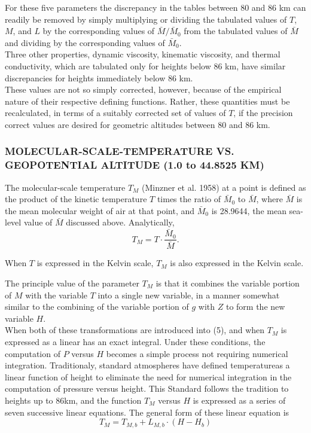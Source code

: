 \documentclass{article}
\begin{document}
For these five parameters the discrepancy in the tables between 80 and 86 km can readily be removed by simply multiplying or dividing the tabulated values of $T$, $M$, and $L$ by the corresponding values of $\bar{M} / \bar{M}_0$ from the tabulated values of $\bar{M}$ and dividing by the corresponding values of $\bar{M}_0$.\\

Three other properties, dynamic viscosity, kinematic viscosity, and thermal conductivity, which are tabulated only for heights below 86 km, have similar discrepancies for heights immediately below 86 km.\\

These values are not so simply corrected, however, because of the empirical nature of their respective defining functions. Rather, these quantities must be recalculated, in terms of a suitably corrected set of values of $T$, if the precision correct values are desired for geometric altitudes between 80 and 86 km.\\

\subsubsection{MOLECULAR-SCALE-TEMPERATURE VS. GEOPOTENTIAL ALTITUDE (1.0 to 44.8525 KM)}

The molecular-scale temperature $T_M$ (Minzner et al. 1958) at a point is defined as the product of the kinetic temperature $T$ times the ratio of $\bar{M}_0$ to $\bar{M}$, where $\bar{M}$ is the mean molecular weight of air at that point, and $\bar{M}_0$ is 28.9644, the mean sea-level value of $\bar{M}$ discussed above. Analytically,
\begin{equation}
  T_M = T \cdot \frac{\bar{M}_0}{\bar{M}}. \tag{22}
\end{equation}

When $T$ is expressed in the Kelvin scale, $T_M$ is also expressed in the Kelvin scale.

The principle value of the parameter $T_M$ is that it combines the variable portion of $M$ with the variable $T$ into a single new variable, in a manner somewhat similar to the combining of the variable portion of $g$ with $Z$ to form the new variable $H$.\\
When both of these transformations are introduced into (5), and when $T_M$ is expressed as a linear has an exact integral. Under these conditions, the computation of $P$ versus $H$ becomes a simple process not requiring numerical integration. Traditionaly, standard atmospheres have defined temperatureas a linear function of height to eliminate the need for numerical integration in the computation of pressure versus height. This Standard follows the tradition to heights up to 86km, and the function $T_M$ versus $H$ is expressed as a series of seven successive linear equations. The general form of these linear equation is 
\begin{equation}
  T_M = T_{M,b} + L_{M,b}\cdot (H - H_b) 
  \tag{23}
\end{equation}
\end{document}
